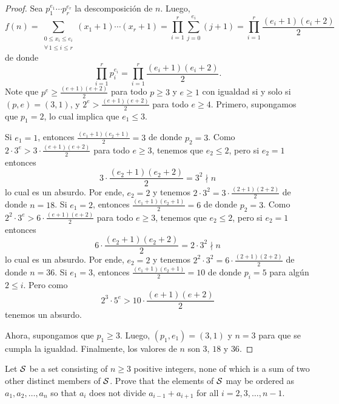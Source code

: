\begin{proof}
	Sea $p_1^{e_1}\cdots p_r^{e_r}$ la descomposición de $n$. Luego,
	\[f(n)=\sum_{\substack{0\le x_i\le e_i\\\forall\,1\le i\le r}}(x_1+1)\cdots(x_r+1)=\prod_{i=1}^r\sum_{j=0}^{e_i}(j+1)=\prod_{i=1}^r\frac{(e_i+1)(e_i+2)}{2}\]
	de donde
	\[\prod_{i=1}^rp_i^{e_i}=\prod_{i=1}^r\frac{(e_i+1)(e_i+2)}{2}.\]
	Note que $p^e\ge\frac{(e+1)(e+2)}{2}$ para todo $p\ge 3$ y $e\ge 1$ con igualdad si y solo si $(p,e)=(3,1)$, y $2^e>\frac{(e+1)(e+2)}{2}$ para todo $e\ge 4$. Primero, supongamos que $p_1=2$, lo cual implica que $e_1\le 3$.
	\begin{itemize}
		\ii Si $e_1=1$, entonces $\frac{(e_1+1)(e_2+1)}{2}=3$ de donde $p_2=3$. Como $2\cdot 3^e>3\cdot\frac{(e+1)(e+2)}{2}$ para todo $e\ge 3$, tenemos que $e_2\le 2$, pero si $e_2=1$ entonces
		\[3\cdot\frac{(e_2+1)(e_2+2)}{2}=3^2\nmid n\]
		lo cual es un absurdo. Por ende, $e_2=2$ y tenemos $2\cdot 3^2=3\cdot\frac{(2+1)(2+2)}{2}$ de donde $n=18$.
		\ii Si $e_1=2$, entonces $\frac{(e_1+1)(e_2+1)}{2}=6$ de donde $p_2=3$. Como $2^2\cdot 3^e>6\cdot\frac{(e+1)(e+2)}{2}$ para todo $e\ge 3$, tenemos que $e_2\le 2$, pero si $e_2=1$ entonces
		\[6\cdot\frac{(e_2+1)(e_2+2)}{2}=2\cdot 3^2\nmid n\]
		lo cual es un absurdo. Por ende, $e_2=2$ y tenemos $2^2\cdot 3^2=6\cdot\frac{(2+1)(2+2)}{2}$ de donde $n=36$.
		\ii Si $e_1=3$, entonces $\frac{(e_1+1)(e_2+1)}{2}=10$ de donde $p_i=5$ para algún $2\le i$. Pero como
		\[2^3\cdot 5^e>10\cdot\frac{(e+1)(e+2)}{2}\]
		tenemos un absurdo.
	\end{itemize}
	Ahora, supongamos que $p_1\ge 3$. Luego, $(p_1,e_1)=(3,1)$ y $n=3$ para que se cumpla la igualdad. Finalmente, los valores de $n$ son $3$, $18$ y $36$.
\end{proof}

\begin{probHR}[ISL 2020/N7]
	Let $\cal S$ be a set consisting of $n\ge 3$ positive integers, none of which is a sum of two other distinct members of $\cal S$. Prove that the elements of $\cal S$ may be ordered as $a_1,a_2,\dots,a_n$ so that $a_i$ does not divide $a_{i-1}+a_{i+1}$ for all $i=2,3,\dots,n-1$.
\end{probHR}

